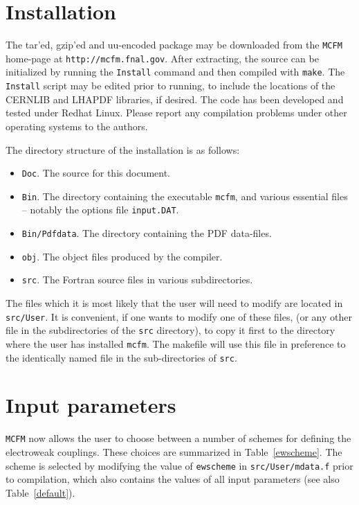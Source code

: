 \documentclass[12pt]{article}
\begin{document}
\section{Installation}

The tar'ed, gzip'ed and uu-encoded package may be downloaded from
the {\tt MCFM} home-page at {\tt http://mcfm.fnal.gov}.
After extracting, the source can be initialized by running the
{\tt Install} command and then compiled with {\tt make}. The
{\tt Install} script may be edited prior to running, to include
the locations of the CERNLIB and LHAPDF libraries, if desired.
The code has been developed and tested under Redhat Linux. Please report
any compilation problems under other operating systems to the authors.

The directory structure of the installation is as follows:
\begin{itemize}
\item {\tt Doc}. The source for this document.
\item {\tt Bin}. The directory containing the executable {\tt mcfm},
and various essential files -- notably the options file {\tt input.DAT}.
\item {\tt Bin/Pdfdata}. The directory containing the PDF data-files.
\item {\tt obj}. The object files produced by the compiler. 
\item {\tt src}. The Fortran source files in various subdirectories.
\end{itemize}
The files which it is most likely that the user will need to modify
are located in {\tt src/User}. It is convenient, if one wants to 
modify one of these files, (or any other file in the subdirectories of the 
{\tt src} directory),
to copy it first to the directory where the user has installed {\tt mcfm}.
The makefile will use this file in preference to the identically named
file in the sub-directories of {\tt src}.
 
\section{Input parameters}

{\tt MCFM} now allows the user to choose between a number of schemes
for defining the electroweak couplings. These choices are summarized
in Table~\ref{ewscheme}. The scheme is selected by modifying the
value of {\tt ewscheme} in {\tt src/User/mdata.f} prior to compilation, 
which also contains
the values of all input parameters (see also Table~\ref{default}).
\end{document}
